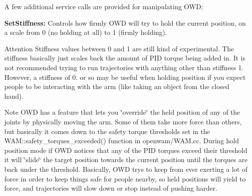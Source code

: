 A few additional service calls are provided for manipulating O\-W\-D\-:


\begin{DoxyItemize}
\item {\bfseries Set\-Stiffness\-:} Controls how firmly O\-W\-D will try to hold the current position, on a scale from 0 (no holding at all) to 1 (firmly holding). \begin{DoxyAttention}{Attention}
Stiffness values between 0 and 1 are still kind of experimental. The stiffness basically just scales back the amount of P\-I\-D torque being added in. It is not recommended trying to run trajectories with anything other than stiffness 1. However, a stiffness of 0. or so may be useful when holding position if you expect people to be interacting with the arm (like taking an object from the closed hand). 
\end{DoxyAttention}
\begin{DoxyNote}{Note}
O\-W\-D has a feature that lets you \char`\"{}override\char`\"{} the held position of any of the joints by physically moving the arm. Some of them take more force than others, but basically it comes down to the safety torque thresholds set in the W\-A\-M\-::safety\-\_\-torques\-\_\-exceeded() function in openwam/\-W\-A\-M.\-cc. During hold position mode if O\-W\-D notices that any of the P\-I\-D torques exceed their threshold it will \char`\"{}slide\char`\"{} the target position towards the current position until the torques are back under the threshold. Basically, O\-W\-D trys to keep from ever exerting a lot of force in order to keep things safe for people nearby, so held positions will yield to force, and trajectories will slow down or stop instead of pushing harder.
\end{DoxyNote}


\end{DoxyItemize}
